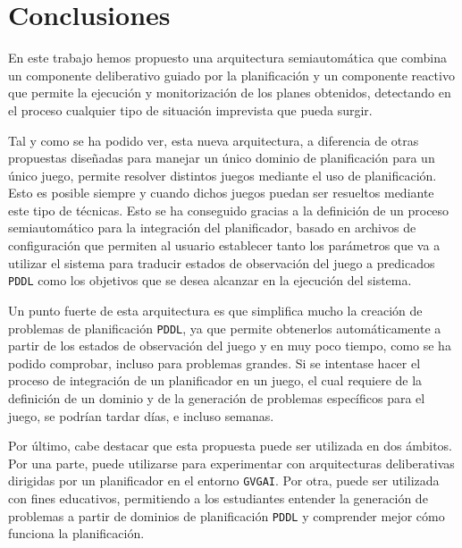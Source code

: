 
\chapter{Conclusiones}

En este trabajo hemos propuesto una arquitectura semiautomática que combina un componente
deliberativo guiado por la planificación y un componente reactivo que permite la ejecución y
monitorización de los planes obtenidos, detectando en el proceso cualquier tipo de situación
imprevista que pueda surgir.

Tal y como se ha podido ver, esta nueva arquitectura, a diferencia de otras propuestas diseñadas para
manejar un único dominio de planificación para un único juego, permite resolver distintos juegos mediante
el uso de planificación. Esto es posible siempre y cuando dichos juegos puedan ser resueltos mediante este
tipo de técnicas. Esto se ha conseguido gracias a la definición de un proceso semiautomático para la
integración del planificador, basado en archivos de configuración que permiten al usuario establecer tanto
los parámetros que va a utilizar el sistema para traducir estados de observación del juego a predicados
\texttt{PDDL} como los objetivos que se desea alcanzar en la ejecución del sistema.

Un punto fuerte de esta arquitectura es que simplifica mucho la creación de problemas
de planificación \texttt{PDDL}, ya que permite obtenerlos automáticamente a partir
de los estados de observación del juego y en muy poco tiempo, como se ha podido comprobar, incluso
para problemas grandes. Si se intentase hacer el proceso de integración de un planificador en un juego,
el cual requiere de la definición de un dominio y de la generación de problemas específicos para el juego,
se podrían tardar días, e incluso semanas.

Por último, cabe destacar que esta propuesta puede ser utilizada en dos ámbitos. Por una parte, puede
utilizarse para experimentar con arquitecturas deliberativas dirigidas por un planificador en el entorno
\texttt{GVGAI}. Por otra, puede ser utilizada con fines educativos, permitiendo a los estudiantes entender la
generación de problemas a partir de dominios de planificación \texttt{PDDL} y comprender mejor cómo funciona
la planificación.

